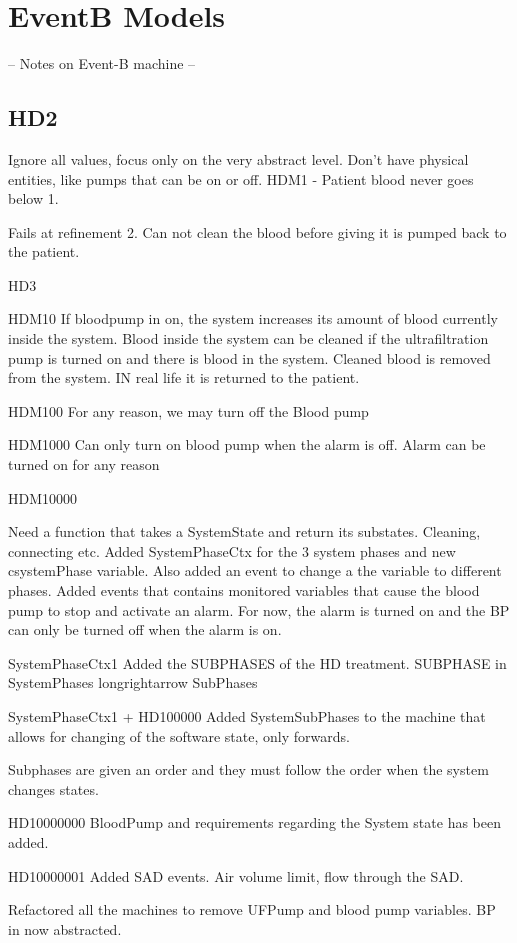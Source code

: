 \section{EventB Models}
-- Notes on Event-B machine --

\subsection{HD2}
Ignore all values, focus only on the very abstract level. Don't have physical entities, like pumps that can be on or off.
HDM1 - Patient blood never goes below 1.


Fails at refinement 2. Can not clean the blood before giving it is pumped back to the patient.

HD3

HDM10
If bloodpump in on, the system increases its amount of blood currently inside the system.
Blood inside the system can be cleaned if the ultrafiltration pump is turned on and there is blood in the system.
Cleaned blood is removed from the system. IN real life it is returned to the patient. 

HDM100
For any reason, we may turn off the Blood pump

HDM1000
Can only turn on blood pump when the alarm is off.
Alarm can be turned on for any reason

HDM10000

Need a function that takes a SystemState and return its substates. Cleaning, connecting etc.
Added SystemPhaseCtx for the 3 system phases and new csystemPhase variable. Also added an event to change a the variable to different phases.
Added events that contains monitored variables that cause the blood pump to stop and activate an alarm. For now, the alarm is turned on and the BP can only be turned off when the alarm is on.


SystemPhaseCtx1
Added the SUBPHASES of the HD treatment. 
SUBPHASE in SystemPhases longrightarrow SubPhases

SystemPhaseCtx1 + HD100000
Added SystemSubPhases to the machine that allows for changing of the software state, only forwards.

Subphases are given an order and they must follow the order when the system changes states.


HD10000000
BloodPump and requirements regarding the System state has been added. 


HD10000001
Added SAD events. Air volume limit, flow through the SAD. 


Refactored all the machines to remove UFPump and blood pump variables. BP in now abstracted. 

